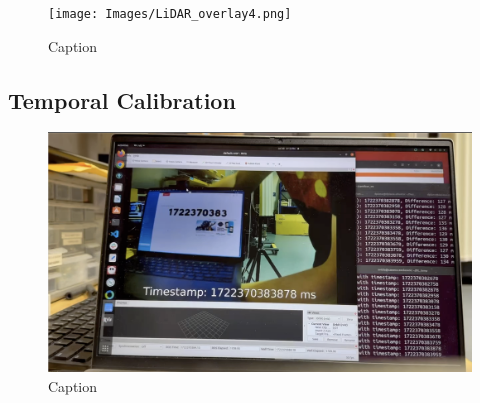 \documentclass{erauthesis}
\begin{document}






\begin{figure}[htbp]
    \centering
    \texttt{[image: Images/LiDAR\_overlay4.png]}
    \caption{Caption}
    \label{fig:LiDAR_overlay4}
\end{figure}


\subsection{Temporal Calibration}

\begin{figure}[htbp]
    \centering
    \includegraphics[width=0.8\linewidth]{Images/time_sync1.png}
    \caption{Caption}
    \label{fig:time_sync1}
\end{figure}

\end{document}
